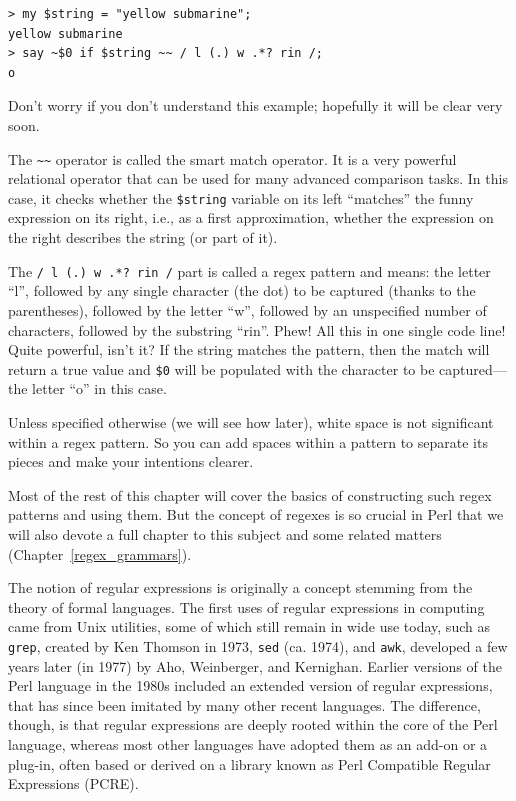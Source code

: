 \begin{verbatim}
> my $string = "yellow submarine";
yellow submarine
> say ~$0 if $string ~~ / l (.) w .*? rin /;
o
\end{verbatim}

Don't worry if you don't understand this example; 
hopefully it will be clear very soon.

The \verb'~~' operator is called the smart match operator. It is 
a very powerful relational operator that can be used for 
many advanced comparison tasks. In this case, it checks whether 
the {\tt \$string} variable on its left ``matches''  
the funny expression on its right, i.e., as a first 
approximation, whether the expression on the right describes 
the string (or part of it). 

The \verb'/ l (.) w .*? rin /' part is called a regex pattern and means: 
the letter ``l'', followed by any single character (the dot) to be 
captured (thanks to the parentheses), followed by the letter ``w'', 
followed by an unspecified number of characters, followed by the 
substring ``rin''. Phew! All this in one single code line! Quite 
powerful, isn't it? If the string matches the pattern, then 
the match will return a true value and \verb'$0' will be 
populated with the character to be captured---the letter ``o'' 
in this case.

Unless specified otherwise (we will see how later), white space 
is not significant within a regex pattern. So you can add spaces 
within a pattern to separate its pieces and make your 
intentions clearer.

Most of the rest of this chapter will cover the basics of constructing 
such regex patterns and using them. But the concept of 
regexes is so crucial in Perl that we will also devote a full 
chapter to this subject and some related matters (Chapter~\ref{regex_grammars}).

The notion of regular expressions is originally a concept 
stemming from the theory of formal languages. The first 
uses of regular expressions in computing came from 
Unix utilities, some of which still remain in wide use today, such as 
{\tt grep}, created by Ken Thomson in 1973, {\tt sed} (ca. 1974), and 
{\tt awk}, developed a few years later (in 1977) by Aho, Weinberger, and Kernighan. 
Earlier versions of the Perl language in the 1980s included an 
extended version of regular expressions, that has since 
been imitated by many other recent languages. The difference, 
though, is that regular expressions are deeply rooted within the 
core of the Perl language, whereas most other languages have 
adopted them as an add-on or a plug-in, often based or derived 
on a library known as Perl Compatible Regular Expressions (PCRE).

